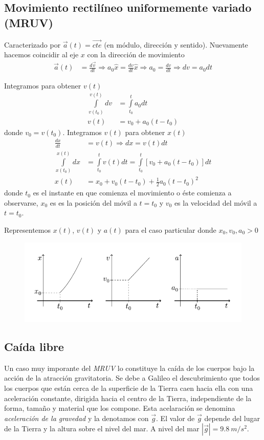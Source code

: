 \subsection{Movimiento rectilíneo uniformemente variado (MRUV)}
Caracterizado por $\vec{a}(t) = \vec{cte}$ (en módulo, dirección y sentido). Nuevamente hacemos coincidir al eje $x$ con
 la dirección de movimiento
\begin{align*}
  \vec{a}(t) &= \frac{d\vec{v}}{dt} \Longrightarrow a_0 \hat{x} = \frac{dv}{dt} \hat{x} \Longrightarrow 
  a_0 = \frac{dv}{dt} \Longrightarrow dv = a_0 dt
\end{align*}

Integramos para obtener $v(t)$
\begin{align*}
  \int\limits_{v(t_0)}^{v(t)} dv &= \int\limits_{t_0}^{t}a_0 dt \\
  v(t) &= v_0 + a_0(t-t_0)
\end{align*}
donde $v_0 = v(t_0)$. Integramos $v(t)$ para obtener $x(t)$
\begin{align*}
  \frac{dx}{dt} &= v(t) \Longrightarrow dx = v(t)dt \\
  \int\limits_{x(t_0)}^{x(t)}dx &= \int\limits_{t_0}^{t}v(t)dt = \int\limits_{t_0}^{t}[v_0 + a_0(t-t_0)]dt \\
  x(t) &= x_0 + v_0(t-t_0) + \frac{1}{2}a_0(t-t_0)^2
\end{align*}
donde $t_0$ es el instante en que comienza el movimiento o éste comienza a observarse, $x_0$ es es la posición del móvil
 a $t=t_0$ y $v_0$ es la velocidad del móvil a $t=t_0$.

\para
Representemos $x(t)$, $v(t)$ y $a(t)$ para el caso particular donde $x_0,v_0,a_0 > 0$

\begin{figure}[htbp]
  \centering
  \includegraphics[]{images/f1-12.pdf}
  \caption{}
\end{figure}

\subsection{Caída libre}
Un caso muy imporante del \textit{MRUV} lo constituye la caída de los cuerpos bajo la acción de la atracción 
gravitatoria. Se debe a Galileo el descubrimiento que todos los cuerpos que están cerca de la superficie de la Tierra 
caen hacia ella con una aceleración constante, dirigida hacia el centro de la Tierra, independiente de la forma, tamaño 
y material que los compone. Esta acelaración se denomina \textit{aceleración de la gravedad} y la denotamos con 
$\vec{g}$. El valor de $\vec{g}$ depende del lugar de la Tierra y la altura sobre el nivel del mar. A nivel del mar 
$\left|\vec{g}\right| = 9.8 \ m/s^2$.

